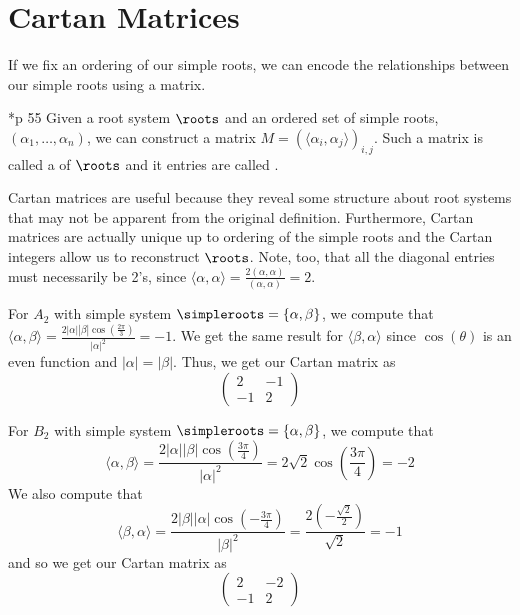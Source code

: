 \documentclass[11pt,leqno,oneside]{amsart}
\numberwithin{thm}{section}
\begin{document}
\section{Cartan Matrices}
If we fix an ordering of our simple roots, we can encode the
relationships between our simple roots using a matrix.
\begin{defn}\cite{humph}*{p 55}
  Given a root system \(\roots\) and an ordered set of simple roots,
  \((\alpha_1, \ldots, 
  \alpha_n)\), we can construct a matrix \(M = (\langle
  \alpha_i,\alpha_j \rangle)_{i,j}\). Such a matrix is called a
   of \(\roots\) and it entries are called .
\end{defn}
Cartan matrices are useful because they reveal some structure about
root systems that may not be apparent from the original
definition. Furthermore, Cartan matrices are actually unique up to
ordering of the simple roots and the Cartan integers allow us to
reconstruct \(\roots\). Note, too, that all the diagonal entries must
necessarily be 2's, since \(\langle \alpha, \alpha \rangle =
\frac{2(\alpha,\alpha)}{(\alpha,\alpha)} = 2\).
\begin{example}
  For \(A_2\) with simple system \(\simpleroots = \{\alpha,\beta\}\), we
  compute that \(\langle \alpha,\beta \rangle = \frac{2
    |\alpha||\beta|\cos(\frac{2\pi}{3})}{|\alpha|^2} = -1\). We get
  the same result for \(\langle \beta,\alpha \rangle\) since
  \(\cos(\theta)\) 
  is an even function and \(|\alpha| = |\beta|\). Thus, we get our
  Cartan matrix as \[
    \left(
      \begin{array}{cc}
        2&-1\\
        -1&2
      \end{array}
\right)
  \]
\end{example}
\begin{example}
  For \(B_2\) with simple system \(\simpleroots = \{\alpha,\beta\}\), we
  compute that \[\langle  \alpha,\beta \rangle =
  \frac{2|\alpha||\beta|\cos(\frac{3\pi}{4})}{|\alpha|^2} =
  2 \sqrt{2} \cos(\frac{3\pi}{4}) = -2\] We also compute that \[
  \langle \beta,\alpha \rangle = \frac{2|\beta||\alpha|
    \cos(-\frac{3\pi}{4})}{|\beta|^2} = \frac{2
    (-\frac{\sqrt{2}}{2})}{\sqrt{2}} = -1
  \]
  and so we get our Cartan matrix as \[
    \left(
      \begin{array}{cc}
        2&-2\\
        -1&2
      \end{array}
\right)
  \]
\end{example}
\end{document}
